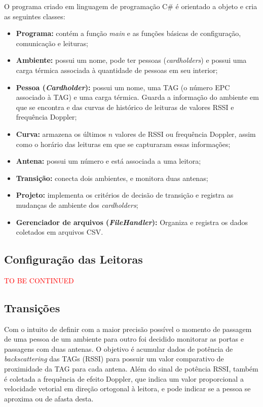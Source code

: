  O programa criado em linguagem de programação C\# é orientado a objeto e cria as seguintes classes:
 
 \begin{itemize}
     \item \textbf{Programa:} contém a função \textit{main} e as funções básicas de configuração, comunicação e leituras;
     \item \textbf{Ambiente:} possui um nome, pode ter pessoas (\textit{cardholders}) e possui uma carga térmica associada à quantidade de pessoas em seu interior;
     \item \textbf{Pessoa (\textit{Cardholder}):} possui um nome, uma TAG (o número EPC associado à TAG) e uma carga térmica. Guarda a informação do ambiente em que se encontra e das curvas de histórico de leituras de valores RSSI e frequência Doppler;
     \item \textbf{Curva:} armazena os últimos $n$ valores de RSSI ou frequência Doppler, assim como o horário das leituras em que se capturaram essas informações;
     \item \textbf{Antena:} possui um número e está associada a uma leitora;
     \item \textbf{Transição:} conecta dois ambientes, e monitora duas antenas;
     \item \textbf{Projeto:} implementa os critérios de decisão de transição e registra as mudanças de ambiente dos \textit{cardholders};
     \item \textbf{Gerenciador de arquivos (\textit{FileHandler}):} Organiza e registra os dados coletados em arquivos CSV.
 \end{itemize}
 
 \subsection{Configuração das Leitoras}

\textcolor{red}{TO BE CONTINUED} %

 \subsection{Transições}
 
 Com o intuito de definir com a maior precisão possível o momento de passagem de uma pessoa de um ambiente para outro foi decidido monitorar as portas e passagens com duas antenas. O objetivo é acumular dados de potência de \textit{backscattering} das TAGs (RSSI) para possuir um valor comparativo de proximidade da TAG para cada antena. Além do sinal de potência RSSI, também é coletada a frequência de efeito Doppler, que indica um valor proporcional a velocidade vetorial em direção ortogonal à leitora, e pode indicar se a pessoa se aproxima ou de afasta desta.
 
